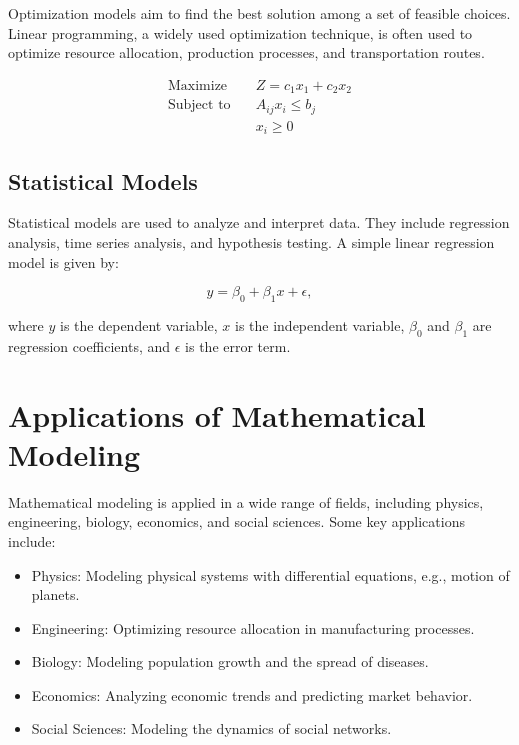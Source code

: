 \documentclass{article}
\begin{document}
Optimization models aim to find the best solution among a set of feasible choices. Linear programming, a widely used optimization technique, is often used to optimize resource allocation, production processes, and transportation routes.

\begin{align}
\text{Maximize} \quad & Z = c_1x_1 + c_2x_2 \\
\text{Subject to} \quad & A_{ij}x_i \leq b_j \\
& x_i \geq 0
\end{align}

\subsection{Statistical Models}

Statistical models are used to analyze and interpret data. They include regression analysis, time series analysis, and hypothesis testing. A simple linear regression model is given by:

\begin{equation}
y = \beta_0 + \beta_1 x + \epsilon,
\end{equation}

where $y$ is the dependent variable, $x$ is the independent variable, $\beta_0$ and $\beta_1$ are regression coefficients, and $\epsilon$ is the error term.

\section{Applications of Mathematical Modeling}

Mathematical modeling is applied in a wide range of fields, including physics, engineering, biology, economics, and social sciences. Some key applications include:

\begin{itemize}
\item Physics: Modeling physical systems with differential equations, e.g., motion of planets.
\item Engineering: Optimizing resource allocation in manufacturing processes.
\item Biology: Modeling population growth and the spread of diseases.
\item Economics: Analyzing economic trends and predicting market behavior.
\item Social Sciences: Modeling the dynamics of social networks.
\end{itemize}
\end{document}
